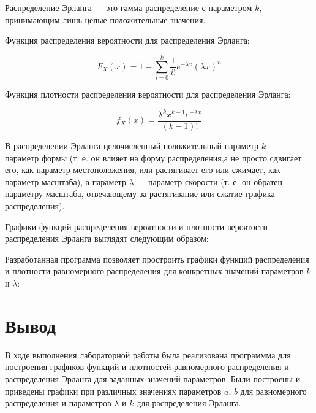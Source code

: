 Распределение Эрланга --- это гамма-распределение  с параметром $k$, принимающим лишь целые положительные значения. 

Функция распределения вероятности для распределения Эрланга:

\begin{equation*}
F_X(x) = 1 - \sum_{i=0}^k  \frac{1}{i!} e^{-\lambda x} (\lambda x)^n
\end{equation*}
	
Функция плотности распределения вероятности для распределения Эрланга:

\begin{equation*}
f_X(x) = \frac{\lambda^k x^{k-1} e^{-\lambda x} } {(k-1)!}
\end{equation*}

В распределении Эрланга целочисленный положительный параметр $k$ 	--- параметр формы (т. е. он влияет на форму распределения,а не просто сдвигает его, как параметр местоположения, или растягивает его или сжимает, как параметр масштаба), а параметр $\lambda$ --- параметр скорости (т. е. он обратен параметру масштаба, отвечающему за растягивание или сжатие графика распределения). 

Графики функций распределения вероятности и плотности вероятости распределения Эрланга выглядят следующим образом:



Разработанная программа позволяет простроить графики функций распределения и плотности равномерного распределения для конкретных значений параметров $k$ и $\lambda$:


\section*{Вывод}

В ходе выполнения лабораторной работы была реализована программма для построения графиков функций и плотностей равномерного распределения и распределения Эрланга для заданных значений параметров.
Были построены и приведены графики при различных значениях параметров $a$, $b$ для равномерного распределения и параметров $\lambda$ и $k$ для распределения Эрланга.
